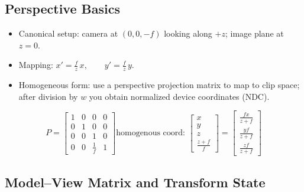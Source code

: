 \documentclass[10pt,twocolumn]{extarticle}
\begin{document}
\subsection*{Perspective Basics}
\begin{itemize}
  \item Canonical setup: camera at \((0,0,-f)\) looking along \(+z\); image plane at \(z=0\).
  \item Mapping:
  $
    x'=\frac{f}{z}\,x,\qquad y'=\frac{f}{z}\,y.
  $
  \item Homogeneous form: use a perspective projection matrix to map to clip space; after division by \(w\) you obtain normalized device coordinates (NDC).
\end{itemize}
\[P = \begin{bmatrix}
  1 & 0 & 0 & 0 \\
  0 & 1 & 0 & 0 \\
  0 & 0 & 1 & 0 \\
  0 & 0 & \frac{1}{f} & 1
  \end{bmatrix} \text{homogenous coord: }\begin{bmatrix}
    x \\ y \\ z\\ \frac{z+f}{f}
  \end{bmatrix} = \begin{bmatrix}
    \frac{fx}{z+f}\\ \frac{yf}{z+f}\\ \frac{zf}{z+f}
  \end{bmatrix}\]
  \subsection{Model--View Matrix and Transform State}
\end{document}
